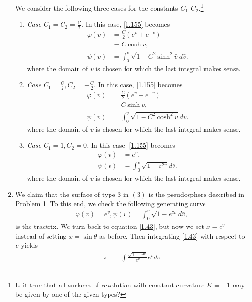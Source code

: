\documentclass[a4paper]{article}
\numberwithin{equation}{section}
\begin{document}
\begin{enumerate}
We consider the following three cases for the constants $C_1,C_2$.\footnote{Is it true that all surfaces of revolution with constant curvature $K=-1$ may be given by one of the given types?}
\begin{enumerate}
\item \textit{Case $C_1=C_2=\frac{C}{2}$.} In this case, \eqref{1.155} becomes
\begin{align}
\varphi \left( v \right)& = \frac{C}{2}\left( {{e^v} + {e^{ - v}}} \right)\\
& = C\cosh v,\\
\psi \left( v \right) &= \int_0^v {\sqrt {1 - {C^2}{{\sinh }^2}\bar v} d\bar v} .
\end{align}
where the domain of $v$ is chosen for which the last integral makes sense. 
\item \textit{Case $C_1 =\frac{C}{2},C_2=-\frac{C}{2}$.} In this case, \eqref{1.155} becomes
\begin{align}
\varphi \left( v \right) &= \frac{C}{2}\left( {{e^v} - {e^{ - v}}} \right)\\
 &= C\sinh v,\\
\psi \left( v \right) &= \int_0^v {\sqrt {1 - {C^2}{{\cosh }^2}\bar v} d\bar v} .
\end{align}
where the domain of $v$ is chosen for which the last integral makes sense. 
\item \textit{Case $C_1=1,C_2=0$.} In this case, \eqref{1.155} becomes
\begin{align}
\varphi \left( v \right) &= {e^v},\\
\psi \left( v \right) &= \int_0^v {\sqrt {1 - {e^{2\bar v}}} d\bar v} .
\end{align} 
where the domain of $v$ is chosen for which the last integral makes sense. 
\end{enumerate}
\item We claim that the surface of type 3 in $\left(3\right)$ is the pseudosphere described in Problem 1. To this end, we check the following generating curve
\begin{align}
\label{1.156}
\varphi \left( v \right) = {e^v},\psi \left( v \right) = \int_0^v {\sqrt {1 - {e^{2\bar v}}} d\bar v} ,
\end{align}
is the tractrix. We turn back to equation \eqref{1.43}, but now we set $x=e^v$ instead of setting $x= \sin \theta$ as before. Then integrating \eqref{1.43} with respect to $v$ yields 
\begin{align}
z &= \int {\frac{{\sqrt {1 - {e^{2v}}} }}{{{e^v}}}{e^v}dv} \\

\end{align}
\end{enumerate}
\end{document}
